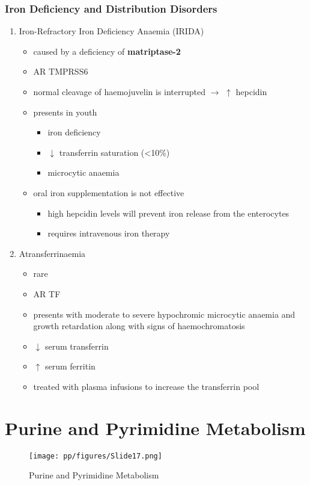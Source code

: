 \documentclass[12pt]{scrartcl}
\begin{document}
\subsubsection{Iron Deficiency and Distribution Disorders}
\label{sec:org6272b32}
\begin{enumerate}
\item Iron-Refractory Iron Deficiency Anaemia (IRIDA)
\label{sec:org803cb2c}
\begin{itemize}
\item caused by a deficiency of \textbf{matriptase-2}
\item AR TMPRSS6
\item normal cleavage of haemojuvelin is interrupted \(\to\) \(\uparrow\) hepcidin
\item presents in youth
\begin{itemize}
\item iron deficiency
\item \(\downarrow\) transferrin saturation (<10\%)
\item microcytic anaemia
\end{itemize}
\item oral iron supplementation is not effective
\begin{itemize}
\item high hepcidin levels will prevent iron release from the
enterocytes
\item requires intravenous iron therapy
\end{itemize}
\end{itemize}

\item Atransferrinaemia
\label{sec:org34644f6}
\begin{itemize}
\item rare
\item AR TF
\item presents with moderate to severe hypochromic microcytic anaemia and
growth retardation along with signs of haemochromatosis
\item \(\downarrow\) serum transferrin
\item \(\uparrow\) serum ferritin
\item treated with plasma infusions to increase the transferrin pool
\end{itemize}
\end{enumerate}
\section{Purine and Pyrimidine Metabolism}
\label{sec:org35c50d3}
\begin{figure}[htbp]
\centering
\texttt{[image: pp/figures/Slide17.png]}
\caption{\label{fig:orga34b144}Purine and Pyrimidine Metabolism}
\end{figure}
\end{document}
